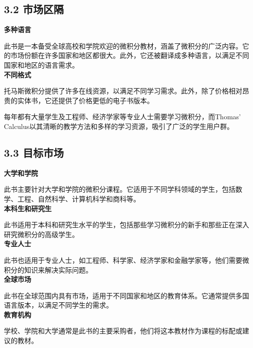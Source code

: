 \documentclass{report}
\begin{document}
\subsection*{3.2 市场区隔}

\noindent\textbf{多种语言}

\noindent 此书是一本备受全球高校和学院欢迎的微积分教材，涵盖了微积分的广泛内容。它的市场份额在许多国家和地区都很大。此外，它还被翻译成多种语言，以满足不同国家和地区的语言需求。
~\\

\noindent\textbf{不同格式}

\noindent 托马斯微积分提供了许多在线资源，以满足不同学习需求。此外，除了价格相对昂贵的实体书，它还提供了价格更低的电子书版本。
~\\


\noindent 每年都有大量学生及工程师、经济学家等专业人士需要学习微积分，而Thomas' Calculus以其清晰的教学方法和多样的学习资源，吸引了广泛的学生用户群。

\subsection*{3.3 目标市场}

\noindent\textbf{大学和学院}

\noindent 此书主要针对大学和学院的微积分课程。它适用于不同学科领域的学生，包括数学、工程、自然科学、计算机科学和商科等。
~\\

\noindent\textbf{本科生和研究生}

\noindent 此书适用于本科和研究生水平的学生，包括那些学习微积分的新手和那些正在深入研究微积分的高级学生。
~\\

\noindent\textbf{专业人士}

\noindent 此书也适用于专业人士，如工程师、科学家、经济学家和金融学家等，他们需要微积分的知识来解决实际问题。
~\\

\noindent\textbf{全球市场}

\noindent 此书在全球范围内具有市场，适用于不同国家和地区的教育体系。它通常提供多国语言版本，以满足不同学生的需求。
~\\

\noindent\textbf{教育机构}

\noindent 学校、学院和大学通常是此书的主要采购者，他们将这本教材作为课程的标配或建议的教材。
~\\
\end{document}
